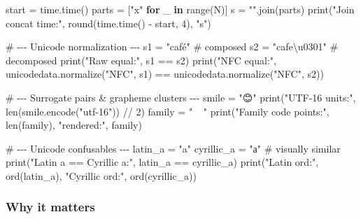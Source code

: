 \documentclass[
  letterpaper,
  DIV=11,
  numbers=noendperiod]{scrreprt}
\newenvironment{Shaded}{\begin{snugshade}}{\end{snugshade}}
\newcommand{\BuiltInTok}[1]{\textcolor[rgb]{0.00,0.23,0.31}{#1}}
\newcommand{\CharTok}[1]{\textcolor[rgb]{0.13,0.47,0.30}{#1}}
\newcommand{\CommentTok}[1]{\textcolor[rgb]{0.37,0.37,0.37}{#1}}
\newcommand{\ControlFlowTok}[1]{\textcolor[rgb]{0.00,0.23,0.31}{\textbf{#1}}}
\newcommand{\DecValTok}[1]{\textcolor[rgb]{0.68,0.00,0.00}{#1}}
\newcommand{\KeywordTok}[1]{\textcolor[rgb]{0.00,0.23,0.31}{\textbf{#1}}}
\newcommand{\NormalTok}[1]{\textcolor[rgb]{0.00,0.23,0.31}{#1}}
\newcommand{\OperatorTok}[1]{\textcolor[rgb]{0.37,0.37,0.37}{#1}}
\newcommand{\StringTok}[1]{\textcolor[rgb]{0.13,0.47,0.30}{#1}}
\begin{document}
\begin{Shaded}
\begin{Highlighting}[]
\NormalTok{start }\OperatorTok{=}\NormalTok{ time.time()}
\NormalTok{parts }\OperatorTok{=}\NormalTok{ [}\StringTok{"x"} \ControlFlowTok{for}\NormalTok{ \_ }\KeywordTok{in} \BuiltInTok{range}\NormalTok{(N)]}
\NormalTok{s }\OperatorTok{=} \StringTok{""}\NormalTok{.join(parts)}
\BuiltInTok{print}\NormalTok{(}\StringTok{"Join concat time:"}\NormalTok{, }\BuiltInTok{round}\NormalTok{(time.time() }\OperatorTok{{-}}\NormalTok{ start, }\DecValTok{4}\NormalTok{), }\StringTok{"s"}\NormalTok{)}

\CommentTok{\# {-}{-}{-} Unicode normalization {-}{-}{-}}
\NormalTok{s1 }\OperatorTok{=} \StringTok{"café"}          \CommentTok{\# composed}
\NormalTok{s2 }\OperatorTok{=} \StringTok{"cafe}\CharTok{\textbackslash{}u0301}\StringTok{"}    \CommentTok{\# decomposed}
\BuiltInTok{print}\NormalTok{(}\StringTok{"Raw equal:"}\NormalTok{, s1 }\OperatorTok{==}\NormalTok{ s2)}
\BuiltInTok{print}\NormalTok{(}\StringTok{"NFC equal:"}\NormalTok{, unicodedata.normalize(}\StringTok{"NFC"}\NormalTok{, s1) }\OperatorTok{==}\NormalTok{ unicodedata.normalize(}\StringTok{"NFC"}\NormalTok{, s2))}

\CommentTok{\# {-}{-}{-} Surrogate pairs \& grapheme clusters {-}{-}{-}}
\NormalTok{smile }\OperatorTok{=} \StringTok{"😊"}
\BuiltInTok{print}\NormalTok{(}\StringTok{"UTF{-}16 units:"}\NormalTok{, }\BuiltInTok{len}\NormalTok{(smile.encode(}\StringTok{"utf{-}16"}\NormalTok{)) }\OperatorTok{//} \DecValTok{2}\NormalTok{)}
\NormalTok{family }\OperatorTok{=} \StringTok{"👨‍👩‍👧‍👦"}
\BuiltInTok{print}\NormalTok{(}\StringTok{"Family code points:"}\NormalTok{, }\BuiltInTok{len}\NormalTok{(family), }\StringTok{"rendered:"}\NormalTok{, family)}

\CommentTok{\# {-}{-}{-} Unicode confusables {-}{-}{-}}
\NormalTok{latin\_a }\OperatorTok{=} \StringTok{"a"}
\NormalTok{cyrillic\_a }\OperatorTok{=} \StringTok{"а"}  \CommentTok{\# visually similar}
\BuiltInTok{print}\NormalTok{(}\StringTok{"Latin a == Cyrillic a:"}\NormalTok{, latin\_a }\OperatorTok{==}\NormalTok{ cyrillic\_a)}
\BuiltInTok{print}\NormalTok{(}\StringTok{"Latin ord:"}\NormalTok{, }\BuiltInTok{ord}\NormalTok{(latin\_a), }\StringTok{"Cyrillic ord:"}\NormalTok{, }\BuiltInTok{ord}\NormalTok{(cyrillic\_a))}
\end{Highlighting}
\end{Shaded}

\subsubsection{Why it matters}\label{why-it-matters-32}
\end{document}
